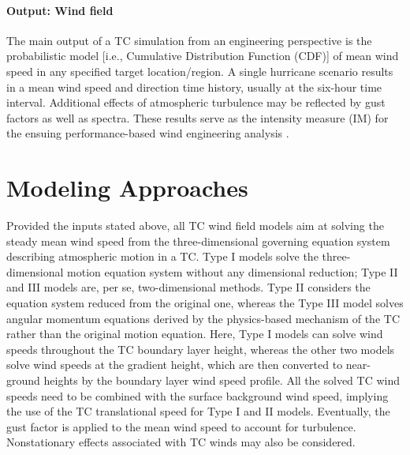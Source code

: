\paragraph{Output: Wind field} The main output of a TC simulation from an engineering perspective is the probabilistic model [i.e., Cumulative Distribution Function (CDF)] of mean wind speed in any specified target location/region. A single hurricane scenario results in a mean wind speed and direction time history, usually at the six-hour time interval. Additional effects of atmospheric turbulence may be reflected by gust factors as well as spectra. These results serve as the intensity measure (IM) for the ensuing performance-based wind engineering analysis \citep{barbato2013performancebased, chuang2019efficient, liu2014projections, spence2014performancebased, unnikrishnan2016performancebased, xiao2011typhoon, yau2011hurricane}.

\section{Modeling Approaches}
\label{sec:storm_wind_methods}

Provided the inputs stated above, all TC wind field models aim at solving the steady mean wind speed from the three-dimensional governing equation system describing atmospheric motion in a TC. Type I models solve the three-dimensional motion equation system without any dimensional reduction; Type II and III models are, per se, two-dimensional methods. Type II considers the equation system reduced from the original one, whereas the Type III model solves angular momentum equations derived by the physics-based mechanism of the TC rather than the original motion equation. Here, Type I models can solve wind speeds throughout the TC boundary layer height, whereas the other two models solve wind speeds at the gradient height, which are then converted to near-ground heights by the boundary layer wind speed profile. All the solved TC wind speeds need to be combined with the surface background wind speed, implying the use of the TC translational speed for Type I and II models. Eventually, the gust factor is applied to the mean wind speed to account for turbulence. Nonstationary effects associated with TC winds may also be considered.

